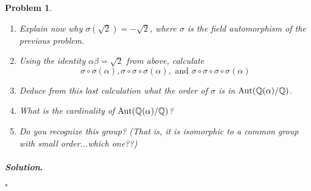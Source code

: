 \documentclass[reqno]{amsart}
\theoremstyle{plain}
\newtheorem{problem}{Problem}
\theoremstyle{definition}
\newenvironment{solution}{\paragraph{\emph{Solution}.}}{\hfill$\square$}
\begin{document}
\begin{problem}
\begin{enumerate}
\begin{enumerate}
\item Deduce that $[\mathbb{Q}(\alpha):\mathbb{Q}(\beta)] = 1$ and that $\mathbb{Q}(\beta) = \mathbb{Q}(\alpha)$.  It then follows that
$$\sigma \in {\rm Aut}(\mathbb{Q}(\alpha)/\mathbb{Q}). $$
\end{enumerate}
\item Explain now why $\sigma(\sqrt{2}) = -\sqrt{2}$, where $\sigma$ is the field automorphism of the previous problem.
\item Using the identity $\alpha \beta = \sqrt{2}$ from above, calculate
$$\sigma \circ \sigma(\alpha), \sigma \circ \sigma \circ \sigma(\alpha), \text{ and } \sigma \circ \sigma \circ \sigma \circ \sigma(\alpha) $$
\item Deduce from this last calculation what the order of $\sigma$ is in ${\rm Aut}(\mathbb{Q}(\alpha)/\mathbb{Q})$.
\item What is the cardinality of ${\rm Aut}(\mathbb{Q}(\alpha)/\mathbb{Q})$?
\item Do you recognize this group?  (That is, it is isomorphic to a common group with small order...which one??)

\end{enumerate}
\end{problem}
\begin{solution}

\end{solution}
\end{document}
